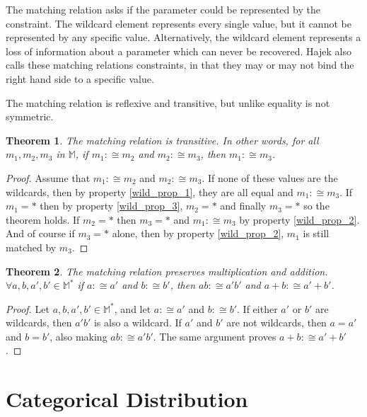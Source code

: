 \documentclass[twoside]{article}
\theoremstyle{plain}%
\newtheorem{theorem}{Theorem}[section]
\theoremstyle{definition}
\theoremstyle{remark}
\begin{document}
The matching relation asks if the parameter could be represented by the
constraint. The wildcard element represents every single value, but it cannot be
represented by any specific value. Alternatively, the wildcard element
represents a loss of information about a parameter which can never be recovered.
Hajek\cite{hajek} also calls these matching relations constraints, in that they may or may not bind the right hand side to a specific value.

The matching relation is reflexive and transitive, but unlike equality is not symmetric.

\begin{theorem}
The matching relation is transitive. In other words, for all \(m_1, m_2, m_3\) in \(\mathbb{M}\), if \(m_1 :\cong m_2\) and \(m_2 :\cong m_3\), then \(m_1 :\cong m_3\).
\end{theorem}

\begin{proof}
Assume that \(m_1 :\cong m_2\) and \(m_2 :\cong m_3\). If none of these values are the wildcards, then by property \ref{wild_prop_1}, they are all equal and \(m_1 :\cong m_3\). If \(m_1 = \ast\) then by property \ref{wild_prop_3}, \(m_2 = \ast\) and finally \(m_3 = \ast\) so the theorem holds. If \(m_2 = \ast\) then \(m_3 = \ast\) and \(m_1 :\cong m_3\) by property \ref{wild_prop_2}. And of course if \(m_3 = \ast\) alone, then by property \ref{wild_prop_2}, \(m_1\) is still matched by \(m_3\).
\end{proof}


\begin{theorem}
\label{theorem:matching_multiplication}
The matching relation preserves multiplication and addition. \(\forall a,b,a',b' \in \mathbb{M^*}\) if \(a :\cong a'\) and \(b :\cong b'\), then \(ab :\cong a'b'\) and \(a+b :\cong a'+b'\).
\end{theorem}

\begin{proof}
Let \(a,b,a',b' \in \mathbb{M^*}\), and let \(a :\cong a'\) and \(b :\cong b'\). If either \(a'\) or \(b'\) are wildcards, then \(a'b'\) is also a wildcard. If \(a'\) and \(b'\) are not wildcards, then \(a = a'\) and \(b = b'\), also making \(ab :\cong a'b'\). The same argument proves \(a+b :\cong a'+b'\).
\end{proof}

\section{Categorical Distribution}
\end{document}
